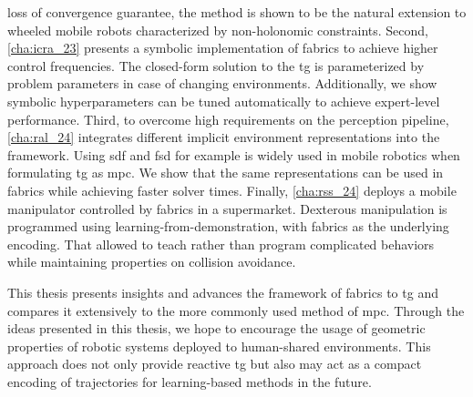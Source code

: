 loss of convergence guarantee, the method is shown to be the natural extension
to wheeled mobile robots characterized by non\hyp{}holonomic constraints.
Second, \cref{cha:icra_23} presents a symbolic
implementation of \ac{fabrics} to achieve higher control frequencies. The
closed-form solution to the \ac{tg} is parameterized by problem parameters in
case of changing environments. Additionally, we show symbolic 
hyperparameters can be tuned automatically to achieve expert-level performance.
Third, to overcome high requirements on the perception pipeline, \cref{cha:ral_24}
integrates different implicit environment representations into the framework.
Using \acf{sdf} and \acf{fsd} for example is widely used in mobile robotics when
formulating \ac{tg} as \ac{mpc}. We show that the same representations can be
used in \ac{fabrics} while achieving faster solver times.
Finally, 
\cref{cha:rss_24} deploys a mobile manipulator controlled by \ac{fabrics}
in a supermarket. Dexterous manipulation is programmed using
learning-from-demonstration, with \ac{fabrics} as the underlying encoding.
That allowed to teach rather than program complicated behaviors while
maintaining properties on collision avoidance.

This thesis presents insights and advances the framework of \ac{fabrics} to
\ac{tg} and compares it extensively to the more commonly used method of \ac{mpc}.
Through the ideas presented in this thesis, we hope to encourage the
usage of geometric properties of robotic systems deployed to human-shared 
environments. This approach does not only provide reactive \ac{tg} but also may
act as a compact encoding of trajectories for learning-based methods in the
future.










